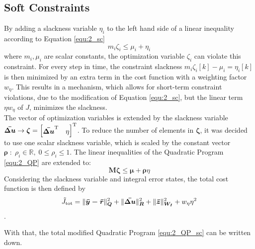 \subsection{Soft Constraints} \label{sec:mpcc_ext_sc}
By adding a slackness variable $\eta_i$ to the left hand side of a linear inequality according to Equation \ref{equ:2_sc}
\begin{equation}
	m_i \zeta_i \le \mu_i + \eta_i
	\label{equ:2_sc}
\end{equation}
where $m_i, \mu_i$ are scalar constants, the optimization variable $\zeta_i$ can violate this constraint. For every step in time, the constraint slackness $m_i \zeta_i[k] - \mu_i = \eta_i[k]$ is then minimized by an extra term in the cost function with a weighting factor $w_\eta$. This results in a mechanism, which allows for short-term constraint violations, due to the modification of Equation \eqref{equ:2_sc}, but the linear term $\eta {w_\eta}$ of $J$, minimizes the slackness.\\
The vector  of optimization variables is extended by the slackness variable  $\boldsymbol{\Bar{\Delta u}} \rightarrow \bm{\zeta} = \begin{bmatrix}
	\bm{\Bar{\Delta u}}^{\mathrm{T}} & \eta
\end{bmatrix}^{\mathrm{T}}$. To reduce the number of elements in $\bm{\zeta}$, it was decided to use one scalar slackness variable, which is scaled by the constant vector $ \bm{\rho} \; : \; \rho_i \in \mathbb{R},\; 0 \le \rho_i \le 1$. The linear inequalities of the Quadratic Program \eqref{equ:2_QP} are extended to:
\[
\bm{M} \bm{\zeta} \le \bm{\mu} + \bm{ \rho} \eta
\]
Considering the slackness variable and integral error states, the total cost function is then defined by
\begin{equation*}
	\Tilde{J}_\mathrm{tot} = \| \bm{{\Bar{y} - \Bar{r}}} \|_{\bm{Q}}^2  + \| \bm{{\Bar{\Delta u}}} \|_{\bm{R}}^2 + \| \bm{{\Bar{z}}} \|_{\bm{W_I}}^2 + w_{\eta} \eta^2
\end{equation*}.

With that, the total modified Quadratic Program \eqref{equ:2_QP_sc} can be written down.

